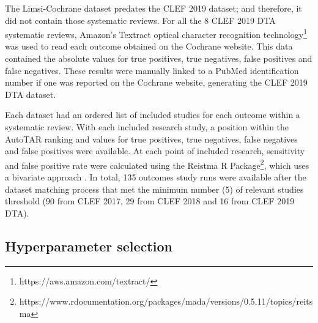 \documentclass[sigconf,natbib=true,anonymous=true]{acmart}
\begin{document}


The Limsi-Cochrane dataset predates the CLEF 2019 dataset; and therefore, it did not contain those systematic reviews. For all the 8 CLEF 2019 DTA systematic reviews, Amazon's Textract optical character recognition technology\footnote{https://aws.amazon.com/textract/} was used to read each outcome obtained on the Cochrane website. This data contained the absolute values for true positives, true negatives, false positives and false negatives. These results were manually linked to a PubMed identification number if one was reported on the Cochrane website, generating the CLEF 2019 DTA dataset. 

Each dataset had an ordered list of included studies for each outcome within a systematic review. With each included research study, a position within the AutoTAR ranking and values for true positives, true negatives, false negatives and false positives were available. At each point of included research, sensitivity and false positive rate were calculated using the Reistma R Package\footnote{https://www.rdocumentation.org/packages/mada/versions/0.5.11/topics/reitsma}, which uses a bivariate approach \cite{reitsma_bivariate_2005}. In total, 135 outcomes study runs were available after the dataset matching process that met the minimum number (5) of relevant studies threshold (90 from CLEF 2017, 29 from CLEF 2018 and 16 from CLEF 2019 DTA).

\subsection{Hyperparameter selection}
\end{document}
